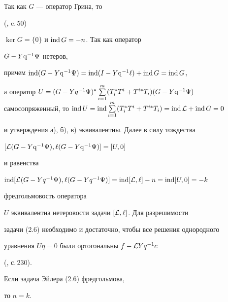 \begin{pf} Так как $G$ --- оператор Грина, то


(\cite{AMR}, c.\,50)


$\ker G=\{0\}$ и $\operatorname{ind} G=-n$. Так как оператор


$G-Y\mathrm{q}^{-1}\Psi$ нетеров,


причем $\ind (G-Y\q^{-1}\Psi)=


\ind (I-Y\q^{-1}\ell)+\ind G=\ind G$,


а оператор $U=


(G-Yq^{-1}\Psi)^*\sum\limits_{i=1}^m(T_i^*T^i+T^{i*}T_i)(G-


Y\q^{-1}\Psi)$ самосопряженный, то $\ind U=\ind\sum\limits_{i=1}^m


(T_i^*T^i+T^{i*}T_i)=\ind {\cal L}+\ind G=0$


и утверждения а), б), в) эквивалентны. Далее в силу тождества


$[{\cal L}(G-Y\mathrm{q}^{-1}\Psi),\ell(G-Y\mathrm{q}^{-1}\Psi)]=[U,0]$


и равенства


$\ind[{\cal L}(G-Yq^{-1}\Psi),\ell(G-Yq^{-1}\Psi)]=


\ind[{\cal L},\ell]-n=\ind [U,0]=-k$


фредгольмовость оператора


$U$ эквивалентна нетеровости задачи $[{\cal L},\ell]$. Для разрешимости


задачи (2.6) необходимо и достаточно, чтобы все решения однородного


уравнения $U\eta=0$ были ортогональны $f-{\cal L}Yq^{-1}c$


(\cite{T}, с.\,230).


\end{pf}





\begin{cor} Если задача Эйлера (2.6) фредгольмова,


то $n=k$.


\end{cor}





